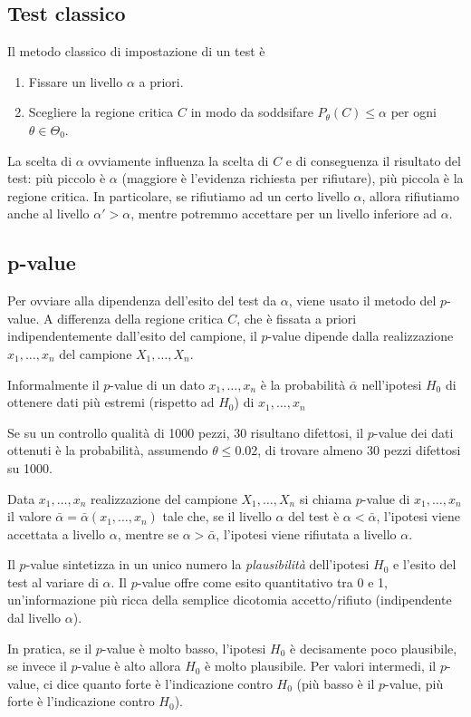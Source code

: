 \subsection{Test classico}
Il metodo classico di impostazione di un test è
\begin{enumerate}
	\item Fissare un livello $\alpha$ a priori.
	\item Scegliere la regione critica $C$ in modo da soddsifare $P_\theta(C) \leq \alpha$ per ogni
	      $\theta \in \Theta_0$.
\end{enumerate}
La scelta di $\alpha$ ovviamente influenza la scelta di $C$ e di conseguenza il risultato del test:
più piccolo è $\alpha$ (maggiore è l'evidenza richiesta per rifiutare), più piccola è la regione
critica. In particolare, se rifiutiamo ad un certo livello $\alpha$, allora rifiutiamo anche al
livello $\alpha' > \alpha$, mentre potremmo accettare per un livello inferiore ad $\alpha$.

\subsection{p-value}
Per ovviare alla dipendenza dell'esito del test da $\alpha$, viene usato il metodo del $p$-value.
A differenza della regione critica $C$, che è fissata a priori indipendentemente dall'esito del
campione, il $p$-value dipende dalla realizzazione $x_1, \dots, x_n$ del campione $X_1, \dots, X_n$.

Informalmente il $p$-value di un dato $x_1, \dots, x_n$ è la probabilità $\bar{\alpha}$
nell'ipotesi $H_0$ di ottenere dati più estremi (rispetto ad $H_0$) di $x_1, \dots, x_n$

\begin{example}
	Se su un controllo qualità di 1000 pezzi, 30 risultano difettosi, il $p$-value dei dati
	ottenuti è la probabilità, assumendo $\theta \leq 0.02$, di trovare almeno 30 pezzi difettosi
	su 1000.
\end{example}

\begin{definition}
	Data $x_1, \dots, x_n$ realizzazione del campione $X_1, \dots, X_n$ si chiama $p$-value di
	$x_1, \dots, x_n$ il valore $\bar{\alpha} = \bar{\alpha} (x_1, \dots, x_n)$ tale
	che, se il livello $\alpha$ del test è $\alpha < \bar{\alpha}$, l'ipotesi viene accettata a
	livello $\alpha$, mentre se $\alpha > \bar{\alpha}$, l'ipotesi viene rifiutata a livello
	$\alpha$.
\end{definition}

Il $p$-value sintetizza in un unico numero la \emph{plausibilità} dell'ipotesi $H_0$ e l'esito del
test al variare di $\alpha$. Il $p$-value offre come esito quantitativo tra 0 e 1, un'informazione
più ricca della semplice dicotomia accetto/rifiuto (indipendente dal livello $\alpha$).

In pratica, se il $p$-value è molto basso, l'ipotesi $H_0$ è decisamente poco plausibile, se invece
il $p$-value è alto allora $H_0$ è molto plausibile. Per valori intermedi, il $p$-value, ci dice
quanto forte è l'indicazione contro $H_0$ (più basso è il $p$-value, più forte è l'indicazione
contro $H_0$).

